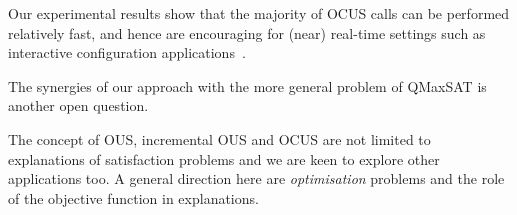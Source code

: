 Our experimental results show that the majority of OCUS calls can be performed relatively fast, and hence are encouraging for (near) real-time settings such as interactive configuration applications~\cite{van2017kb}.


The synergies of our approach with the more general problem of QMaxSAT \cite{DBLP:journals/constraints/IgnatievJM16} is another open question.


The concept of OUS, incremental OUS and OCUS are not limited to explanations of satisfaction problems and we are keen to explore other applications too.
A general direction here are \textit{optimisation} problems and the role of the objective function in explanations.
%

